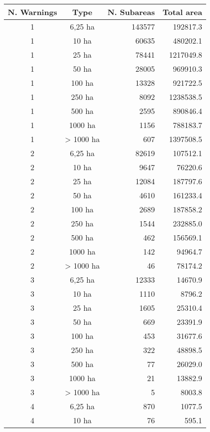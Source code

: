 \begin{table}[h] %
    \centering
    \begin{tabular}{|c|c|r|r|}
        \hline
        \textbf{N. Warnings} & \textbf{Type} & 
        \textbf{N. Subareas} & \textbf{Total area}  \\
        \hline
1 & 6,25 ha   & 143577 &  192817.3 \\
1 & 10 ha     & 60635  &  480202.1 \\
1 & 25 ha     & 78441  & 1217049.8 \\
1 & 50 ha     & 28005  &  969910.3 \\
1 & 100 ha    & 13328  &  921722.5 \\
1 & 250 ha    & 8092   & 1238538.5 \\
1 & 500 ha    & 2595   &  890846.4 \\
1 & 1000 ha   & 1156   &  788183.7 \\
1 & > 1000 ha & 607    & 1397508.5 \\
        \hline
2 & 6,25 ha   & 82619 &   107512.1 \\
2 & 10 ha     & 9647  &    76220.6 \\
2 & 25 ha     & 12084 &   187797.6 \\
2 & 50 ha     & 4610  &   161233.4 \\
2 & 100 ha    & 2689  &   187858.2 \\
2 & 250 ha    & 1544  &   232885.0 \\
2 & 500 ha    & 462   &   156569.1 \\
2 & 1000 ha   & 142   &    94964.7 \\
2 & > 1000 ha & 46    &    78174.2 \\
        \hline
3 & 6,25 ha   & 12333 &    14670.9 \\
3 & 10 ha     & 1110  &     8796.2 \\
3 & 25 ha     & 1605  &    25310.4 \\
3 & 50 ha     & 669   &    23391.9 \\
3 & 100 ha    & 453   &    31677.6 \\
3 & 250 ha    & 322   &    48898.5 \\
3 & 500 ha    & 77    &    26029.0 \\
3 & 1000 ha   & 21    &    13882.9 \\
3 & > 1000 ha & 5     &     8003.8 \\
        \hline
4 & 6,25 ha   & 870   &     1077.5 \\
4 & 10 ha     & 76    &      595.1 \\

\end{tabular}
\end{table}
